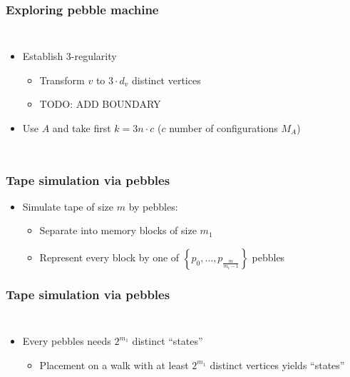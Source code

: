 \documentclass{beamer}
\begin{document}
\begin{frame}
  \frametitle{Exploring pebble machine}
  \begin{columns}
    \begin{itemize}
      \item<3-> Establish 3-regularity
        \begin{itemize}
          \item Transform $v$ to $3\cdot d_{v}$ distinct vertices
          \item TODO: ADD BOUNDARY
        \end{itemize}
      \item<5-> Use $A$ and take first $k = 3n\cdot c$ ($c$ number of
        configurations $M_{A}$)
    \end{itemize}
  \end{columns}
\end{frame}

\begin{frame}
  \frametitle{Tape simulation via pebbles}
  \begin{itemize}
    \item Simulate tape of size $m$ by pebbles:
      \begin{itemize}
        \item<3-> Separate into memory blocks of size $m_{1}$
        \item<4-> Represent every block by one of $\left\{p_{0},\dots,p_{\frac{m}{m_{1}-1}}\right\}$ pebbles
      \end{itemize}
  \end{itemize}
\end{frame}

\begin{frame}
  \frametitle{Tape simulation via pebbles}
  
  \begin{columns}
    \begin{itemize}
      \item Every pebbles needs $2^{m_{1}}$ distinct \enquote{states}
        \begin{itemize}
          \item Placement on a walk with at least $2^{m_{1}}$ distinct vertices
            yields \enquote{states}
        \end{itemize}
    \end{itemize}
    \resizebox{\textwidth}{!}{}
  \end{columns}
\end{frame}
\end{document}

